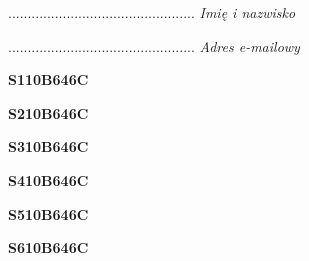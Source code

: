 \begin{turn}{90}\begin{minipage}{\linewidth} \vspace{20mm} ................................................  \textit{Imię i nazwisko}\end{minipage}\end{turn}

\begin{turn}{90}\begin{minipage}{\linewidth} \vspace{20mm} ................................................  \textit{Adres e-mailowy}\end{minipage}\end{turn}

\begin{turn}{90}\huge \begin{minipage}{\linewidth} \vspace{10mm}\textbf{S110B646C}\end{minipage}\end{turn}

\begin{turn}{90}\huge \begin{minipage}{\linewidth} \vspace{10mm}\textbf{S210B646C}\end{minipage}\end{turn}

\begin{turn}{90}\huge \begin{minipage}{\linewidth} \vspace{10mm}\textbf{S310B646C}\end{minipage}\end{turn}

\begin{turn}{90}\huge \begin{minipage}{\linewidth} \vspace{10mm}\textbf{S410B646C}\end{minipage}\end{turn}

\begin{turn}{90}\huge \begin{minipage}{\linewidth} \vspace{10mm}\textbf{S510B646C}\end{minipage}\end{turn}

\begin{turn}{90}\huge \begin{minipage}{\linewidth} \vspace{10mm}\textbf{S610B646C}\end{minipage}\end{turn}

